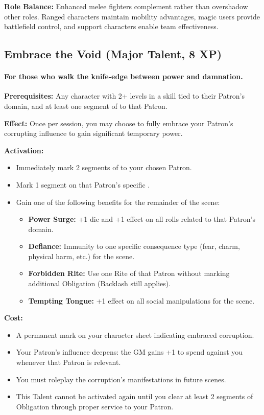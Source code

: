 \textbf{Role Balance:} Enhanced melee fighters complement rather than overshadow other roles. Ranged characters maintain mobility advantages, magic users provide battlefield control, and support characters enable team effectiveness.

\subsection{Embrace the Void (Major Talent, 8 XP)}
\paragraph{For those who walk the knife-edge between power and damnation.}

\textbf{Prerequisites:} Any character with 2+ levels in a skill tied to their Patron's domain, and at least one segment of  to that Patron.

\textbf{Effect:} Once per session, you may choose to fully embrace your Patron’s corrupting influence to gain significant temporary power.

\textbf{Activation:}
\begin{itemize}
    \item Immediately mark 2 segments of  to your chosen Patron.
    \item Mark 1 segment on that Patron’s specific .
    \item Gain one of the following benefits for the remainder of the scene:
    \begin{itemize}
        \item \textbf{Power Surge:} +1 die and +1 effect on all rolls related to that Patron’s domain.
        \item \textbf{Defiance:} Immunity to one specific consequence type (fear, charm, physical harm, etc.) for the scene.
        \item \textbf{Forbidden Rite:} Use one Rite of that Patron without marking additional Obligation (Backlash still applies).
        \item \textbf{Tempting Tongue:} +1 effect on all social manipulations for the scene.
    \end{itemize}
\end{itemize}

\textbf{Cost:}
\begin{itemize}
    \item A permanent mark on your character sheet indicating embraced corruption.
    \item Your Patron’s influence deepens: the GM gains +1  to spend against you whenever that Patron is relevant.
    \item You must roleplay the corruption’s manifestations in future scenes.
    \item This Talent cannot be activated again until you clear at least 2 segments of Obligation through proper service to your Patron.
\end{itemize}

